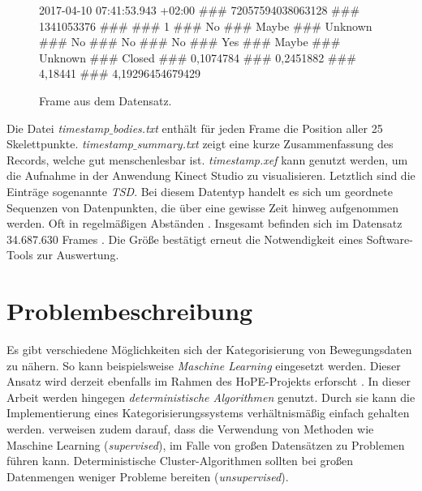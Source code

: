 \begin{figure}[ht]
  \begin{center}
    2017-04-10 07:41:53.943 +02:00 \#\#\# 72057594038063128 \#\#\# 1341053376 \#\#\# 
    \newline \#\#\# 1 \#\#\# No \#\#\# Maybe \#\#\# Unknown \#\#\# No \#\#\# No \#\#\#
    \newline No \#\#\# Yes \#\#\# Maybe \#\#\# Unknown \#\#\# Closed \#\#\# 0,1074784
    \newline \#\#\# 0,2451882 \#\#\# 4,18441 \#\#\# 4,19296454679429
  \end{center}
  \caption{Frame aus dem Datensatz.}
  \label{fig:FrameExample}
\end{figure}

Die Datei \emph{timestamp$\_$bodies.txt} enthält für jeden Frame die Position aller 25 Skelettpunkte.
\emph{timestamp$\_$summary.txt} zeigt eine kurze Zusammenfassung des Records, welche gut menschenlesbar ist.
\emph{timestamp.xef} kann genutzt werden, um die Aufnahme in der Anwendung Kinect Studio zu visualisieren.
Letztlich sind die Einträge sogenannte \emph{\ac{TSD}}.
Bei diesem Datentyp handelt es sich um geordnete Sequenzen von Datenpunkten,
die über eine gewisse Zeit hinweg aufgenommen werden.
Oft in regelmäßigen Abständen \citep{ali_clustering_2019}.
Insgesamt befinden sich im Datensatz 34.687.630 Frames \citep{temiz_konzeption_2022}.
Die Größe bestätigt erneut die Notwendigkeit eines Software-Tools zur Auswertung.

\section{Problembeschreibung}
\label{2-Problembeschreibung}
Es gibt verschiedene Möglichkeiten sich der Kategorisierung von Bewegungsdaten zu nähern.
So kann beispielsweise \emph{Maschine Learning} eingesetzt werden.
Dieser Ansatz wird derzeit ebenfalls im Rahmen des HoPE-Projekts erforscht \citep{plischke_master_2022}.
In dieser Arbeit werden hingegen \emph{deterministische Algorithmen} genutzt.
Durch sie kann die Implementierung eines Kategorisierungssystems verhältnismäßig einfach gehalten werden.
\citet{aghabozorgi_time-series_2015} verweisen zudem darauf, dass die Verwendung von Methoden
wie Maschine Learning (\emph{supervised}), im Falle von großen Datensätzen zu Problemen führen kann.
Deterministische Cluster-Algorithmen sollten bei großen Datenmengen weniger Probleme bereiten (\emph{unsupervised}).

